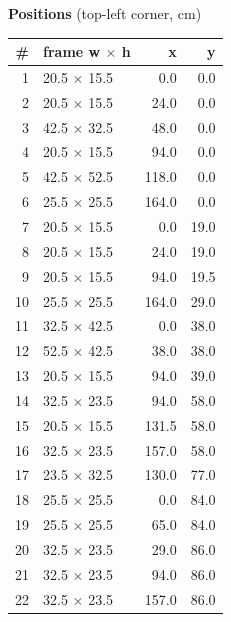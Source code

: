 \documentclass[a4paper,landscape,10pt]{article}
\begin{document}
\begin{minipage}[t]{0.25\textwidth}
\vspace{8pt}
{\bfseries Positions} (top-left corner, cm)\\[2pt]
\tiny
\begin{tabular}{@{}r l r r@{}}
\toprule
\# & frame w $\times$ h & x & y \\
\midrule
1 & 20.5 $\times$ 15.5 & 0.0 & 0.0 \\
2 & 20.5 $\times$ 15.5 & 24.0 & 0.0 \\
3 & 42.5 $\times$ 32.5 & 48.0 & 0.0 \\
4 & 20.5 $\times$ 15.5 & 94.0 & 0.0 \\
5 & 42.5 $\times$ 52.5 & 118.0 & 0.0 \\
6 & 25.5 $\times$ 25.5 & 164.0 & 0.0 \\
7 & 20.5 $\times$ 15.5 & 0.0 & 19.0 \\
8 & 20.5 $\times$ 15.5 & 24.0 & 19.0 \\
9 & 20.5 $\times$ 15.5 & 94.0 & 19.5 \\
10 & 25.5 $\times$ 25.5 & 164.0 & 29.0 \\
11 & 32.5 $\times$ 42.5 & 0.0 & 38.0 \\
12 & 52.5 $\times$ 42.5 & 38.0 & 38.0 \\
13 & 20.5 $\times$ 15.5 & 94.0 & 39.0 \\
14 & 32.5 $\times$ 23.5 & 94.0 & 58.0 \\
15 & 20.5 $\times$ 15.5 & 131.5 & 58.0 \\
16 & 32.5 $\times$ 23.5 & 157.0 & 58.0 \\
17 & 23.5 $\times$ 32.5 & 130.0 & 77.0 \\
18 & 25.5 $\times$ 25.5 & 0.0 & 84.0 \\
19 & 25.5 $\times$ 25.5 & 65.0 & 84.0 \\
20 & 32.5 $\times$ 23.5 & 29.0 & 86.0 \\
21 & 32.5 $\times$ 23.5 & 94.0 & 86.0 \\
22 & 32.5 $\times$ 23.5 & 157.0 & 86.0 \\
\bottomrule
\end{tabular}
\end{minipage}
\clearpage
\end{document}
